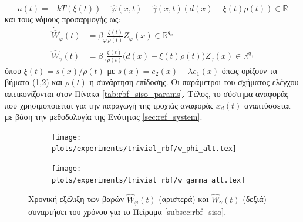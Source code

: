 \begin{equation}
u(t) = -k T(\xi(t)) - \hat{\varphi}(x,t) 
- \hat{\gamma}(x,t) \left( d(x) - \xi(t) \dot{\rho}(t) \right)
\in \mathbb{R}
\label{eq:siso_rbf_control_input}
\end{equation}
και τους νόμους προσαρμογής ως:
\begin{equation}
\begin{alignedat}{1}
\dot{\hat{W}}_{\varphi}(t) &= 
\beta_{\varphi} \frac{\xi(t)}{\rho(t)} Z_{\varphi}(x) 
\in \mathbb{R}^{q_{\varphi}} \\
\dot{\hat{W}}_{\gamma}(t) &= \beta_{\gamma} \frac{\xi(t)}{\rho(t)}
\big( d(x) - \xi(t) \dot{\rho}(t) \big) Z_{\gamma}(x)
\in \mathbb{R}^{q_{\gamma}}
\end{alignedat}
\label{eq:siso_adapt_laws}
\end{equation}
όπου $\xi(t) = s(x)/\rho(t)$ με $s(x) = e_2(x) + \lambda e_1(x)$ όπως ορίζουν τα βήματα (1,2) και $\rho(t)$ η συνάρτηση επίδοσης. Οι παράμετροι του σχήματος ελέγχου απεικονίζονται στον Πίνακα \ref{tab:rbf_siso_params}. Τέλος, το σύστημα αναφοράς που χρησιμοποιείται για την παραγωγή της τροχιάς αναφοράς $x_d(t)$ αναπτύσσεται με βάση την μεθοδολογία της Ενότητας \ref{sec:ref_system}.



\begin{figure}
	\begin{subfigure}{0.5\textwidth}
		\texttt{[image: plots/experiments/trivial\_rbf/w\_phi\_alt.tex]}
	\end{subfigure}
	\begin{subfigure}{0.5\textwidth}
		\texttt{[image: plots/experiments/trivial\_rbf/w\_gamma\_alt.tex]}
	\end{subfigure}
	\caption{ Χρονική εξέλιξη των βαρών $\hat{W}_\varphi(t)$ (αριστερά) και $\hat{W}_\gamma(t)$ (δεξιά) συναρτήσει του χρόνου για το Πείραμα \ref{subsec:rbf_siso}.}
	\label{fig:siso_weights}
\end{figure}

